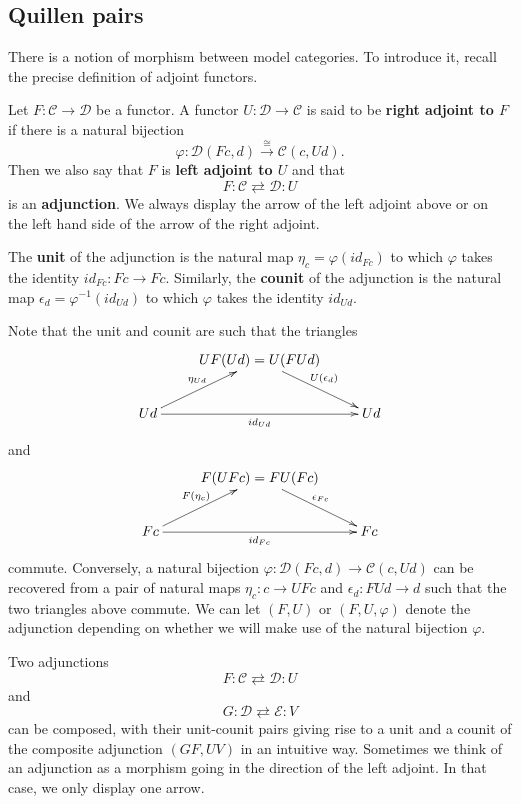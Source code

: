 \subsection{Quillen pairs}

There is a notion of morphism between model categories. To introduce it, recall the precise definition of adjoint functors.
\begin{definition}\label{def:adjoint_functors}
Let $F:\mathscr{C}\to \mathscr{D}$ be a functor. A functor $U:\mathscr{D} \to \mathscr{C}$ is said to be \textbf{right adjoint to $F$} if there is a natural bijection
\[\varphi :\mathscr{D} (Fc,d)\xrightarrow{\cong } \mathscr{C} (c,Ud).\]
Then we also say that $F$ is \textbf{left adjoint to $U$} and that
\[F:\mathscr{C} \rightleftarrows \mathscr{D} :U\]
is an \textbf{adjunction}. We always display the arrow of the left adjoint above or on the left hand side of the arrow of the right adjoint.

The \textbf{unit} of the adjunction is the natural map $\eta _c=\varphi (id_{Fc})$ to which $\varphi$ takes the identity $id_{Fc}:Fc\to Fc$. Similarly, the \textbf{counit} of the adjunction is the natural map $\epsilon _d=\varphi ^{-1}(id_{Ud})$ to which $\varphi$ takes the identity $id_{Ud}$.
\end{definition}
\noindent Note that the unit and counit are such that the triangles
\begin{displaymath}
\xymatrix{
& UF(Ud)=U(FUd) \ar[dr]^{U(\epsilon _d)} \\
Ud \ar[ur]^{\eta _{Ud}} \ar[rr]_{id_{Ud}} && Ud
}
\end{displaymath}
and
\begin{displaymath}
\xymatrix{
& F(UFc)=FU(Fc) \ar[dr]^{\epsilon _{Fc}} \\
Fc \ar[ur]^{F(\eta _{c})} \ar[rr]_{id_{Fc}} && Fc
}
\end{displaymath}
commute. Conversely, a natural bijection $\varphi :\mathscr{D} (Fc,d)\to \mathscr{C} (c,Ud)$ can be recovered from a pair of natural maps $\eta _c:c\to UFc$ and $\epsilon _d:FUd\to d$ such that the two triangles above commute. We can let $(F,U)$ or $(F,U,\varphi )$ denote the adjunction depending on whether we will make use of the natural bijection $\varphi$.

Two adjunctions
\[F:\mathscr{C} \rightleftarrows \mathscr{D} :U\]
and
\[G:\mathscr{D} \rightleftarrows \mathscr{E} :V\]
can be composed, with their unit-counit pairs giving rise to a unit and a counit of the composite adjunction $(GF,UV)$ in an intuitive way. Sometimes we think of an adjunction as a morphism going in the direction of the left adjoint. In that case, we only display one arrow.

